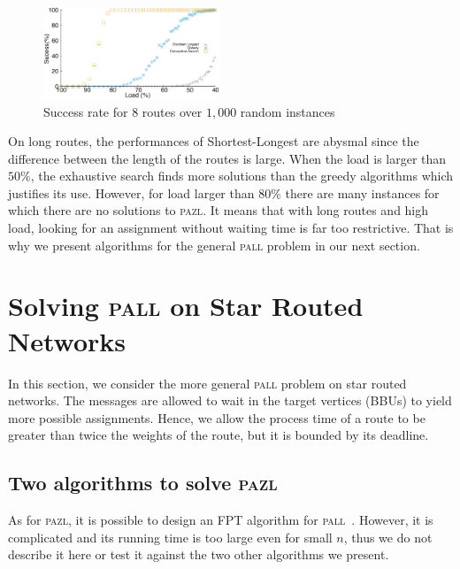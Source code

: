 \documentclass[10pt, conference, letterpaper]{IEEEtran}
\newcommand\pazl{\textsc{pazl}\xspace}
\newcommand\pall{\textsc{pall}\xspace}
\begin{document}
   
\begin{figure}[h]

       \begin{center}
      \includegraphics[width=0.47\textwidth]{echec_longues.eps}
      \end{center}
       
      \caption{Success rate for $8$ routes over $1,000$ random instances}\label{fig:long}
     \end{figure}
     
     On long routes, the performances of Shortest-Longest are abysmal since the difference between the length of the routes is large.
       When the load is larger than $50\%$, the exhaustive search finds more solutions than the greedy algorithms which justifies its use. However, for load larger than $80\%$ there are many instances for which there are no solutions to \pazl.
        It means that with long routes and high load, looking for an assignment without waiting time is far too restrictive. That is why we present algorithms for the general \pall problem in our next section. 
     

         \section{Solving \pall on Star Routed Networks}\label{sec:PALL}
         
    In this section, we consider the more general \pall problem on star routed networks. The messages are allowed to wait in the target vertices (BBUs) to yield more possible assignments. Hence, we allow the process time of a route to be greater than twice the weights of the route, but it is bounded by its deadline.
  
  \subsection{Two algorithms to solve \pazl}
  
  As for \pazl, it is possible to design an FPT algorithm for \pall~\cite{versionlongue}. 
  However, it is complicated and its running time is too large even for small $n$,
  thus we do not describe it here or test it against the two other algorithms we present.
  
\end{document}
